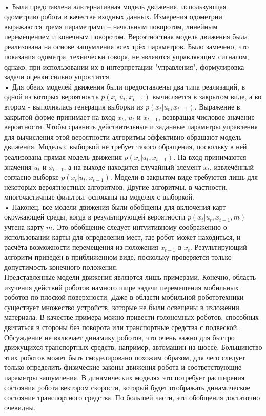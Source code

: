\documentclass[10pt,a4paper]{article}
\begin{document}
• Была представлена альтернативная модель движения, использующая одометрию робота в качестве входных данных. Измерения одометрии выражаются тремя параметрами – начальным поворотом, линейным перемещением и конечным поворотом. Вероятностная модель движения была реализована на основе зашумления всех трёх параметров. Было замечено, что показания одометра, технически говоря, не являются управляющим сигналом, однако, при использовании их в интерпретации "управления", формулировка задачи оценки сильно упростится.\\

• Для обеих моделей движения были предоставлены два типа реализаций, в одной из которых вероятность $p(x_t | u_t, x_{t-1})$ вычисляется в закрытом виде, а во втором - выполнялась генерация выборки из $p(x_t | u_t, x_{t-1})$. Выражение в закрытой форме принимает на вход $x_t$, $u_t$ и $x_{t-1}$, возвращая числовое значение вероятности. Чтобы сравнить действительные и заданные параметры управления для вычисления этой вероятности алгоритмы эффективно обращают модель движения. Модель с выборкой не требует такого обращения, поскольку в ней реализована прямая модель движения $p(x_t | u_t, x_{t-1})$. На вход принимаются значения $u_t$ и $x_{t-1}$, а на выходе находится случайный элемент $x_t$, извлечённый согласно выборке $p(x_t | u_t, x_{t-1})$. Модели в закрытом виде требуются лишь для некоторых вероятностных алгоритмов. Другие алгоритмы, в частности, многочастичные фильтры, основаны на моделях с выборкой.\\

• Наконец, все модели движения были обобщены для включения карт окружающей среды, когда в результирующей вероятности $p(x_t | u_t, x_{t-1}, m)$ учтена карту $m$. Это обобщение следует интуитивному соображению о использовании карты для определения мест, где робот может находиться, и расчёта возможности перемещения из положения $x_{t-1}$ в $x_t$. Результирующий алгоритм приведён в приближенном виде, поскольку проверяется только допустимость конечного положения.\\

Представленные модели движения являются лишь примерами. Конечно, область изучения действий роботов намного шире задачи перемещения мобильных роботов по плоской поверхности. Даже в области мобильной робототехники существует множество устройств, которые не были освещены в изложении материала. В качестве примера можно привести голономных роботов, способных двигаться в стороны без поворота или транспортные средства с подвеской. Обсуждение не включает динамику роботов, что очень важно для быстро движущихся транспортных средств, например, автомашин на шоссе. Большинство этих роботов может быть смоделировано похожим образом, для чего следует только определить физические законы движения робота и соответствующие параметры зашумления. В динамических моделях это потребует расширения состояния робота вектором скорости, который будет отображать динамическое состояние транспортного средства. По большей части, эти обобщения достаточно очевидны.  
 
\end{document}
